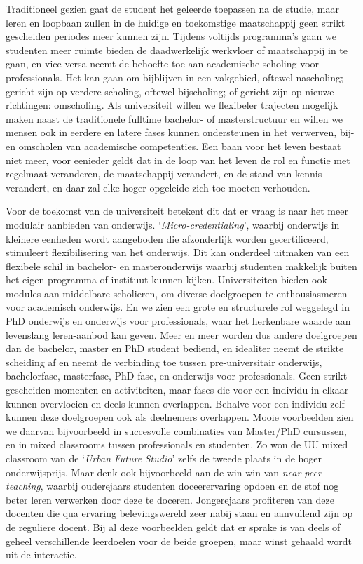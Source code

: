\documentclass[smallauthor, chapterhaspagenum, nochapterinheader, pagenuminheader,  bigchapnum,medium2, tocpages, garamond, titleinheader]{jote-book}
\begin{document}
	Traditioneel gezien gaat de student het geleerde toepassen na de studie, maar leren en loopbaan zullen in de huidige en toekomstige maatschappij geen strikt gescheiden periodes meer kunnen zijn. Tijdens voltijds programma's gaan we studenten meer ruimte bieden de daadwerkelijk werkvloer of maatschappij in te gaan, en vice versa neemt de behoefte toe aan academische scholing voor professionals. Het kan gaan om bijblijven in een vakgebied, oftewel nascholing; gericht zijn op verdere scholing, oftewel bijscholing; of gericht zijn op nieuwe richtingen: omscholing. Als universiteit willen we flexibeler trajecten mogelijk maken naast de traditionele fulltime bachelor- of masterstructuur en willen we mensen ook in eerdere en latere fases kunnen ondersteunen in het verwerven, bij- en omscholen van academische competenties. Een baan voor het leven bestaat niet meer, voor eenieder geldt dat in de loop van het leven de rol en functie met regelmaat veranderen, de maatschappij verandert, en de stand van kennis verandert, en daar zal elke hoger opgeleide zich toe moeten verhouden.



	Voor de toekomst van de universiteit betekent dit dat er vraag is naar het meer modulair aanbieden van onderwijs. ‘\emph{Micro-}\emph{credentialing}', waarbij onderwijs in kleinere eenheden wordt aangeboden die afzonderlijk worden gecertificeerd, stimuleert flexibilisering van het onderwijs. Dit kan onderdeel uitmaken van een flexibele schil in bachelor- en masteronderwijs waarbij studenten makkelijk buiten het eigen programma of instituut kunnen kijken. Universiteiten bieden ook modules aan middelbare scholieren, om diverse doelgroepen te enthousiasmeren voor academisch onderwijs. En we zien een grote en structurele rol weggelegd in PhD onderwijs en onderwijs voor professionals, waar het herkenbare waarde aan levenslang leren-aanbod kan geven. Meer en meer worden dus andere doelgroepen dan de bachelor, master en PhD student bediend, en idealiter neemt de strikte scheiding af en neemt de verbinding toe tussen pre-universitair onderwijs, bachelorfase, masterfase, PhD-fase, en onderwijs voor professionals. Geen strikt gescheiden momenten en activiteiten, maar fases die voor een individu in elkaar kunnen overvloeien en deels kunnen overlappen. Behalve voor een individu zelf kunnen deze doelgroepen ook als deelnemers overlappen. Mooie voorbeelden zien we daarvan bijvoorbeeld in succesvolle combinaties van Master/PhD cursussen, en in mixed classrooms tussen professionals en studenten. Zo won de UU mixed classroom van de ‘\emph{Urban }\emph{Future}\emph{ Studio}' zelfs de tweede plaats in de hoger onderwijsprijs. Maar denk ook bijvoorbeeld aan de win-win van \emph{near}\emph{-peer teaching}, waarbij ouderejaars studenten doceerervaring opdoen en de stof nog beter leren verwerken door deze te doceren. Jongerejaars profiteren van deze docenten die qua ervaring belevingswereld zeer nabij staan en aanvullend zijn op de reguliere docent. Bij al deze voorbeelden geldt dat er sprake is van deels of geheel verschillende leerdoelen voor de beide groepen, maar winst gehaald wordt uit de interactie.
\end{document}
